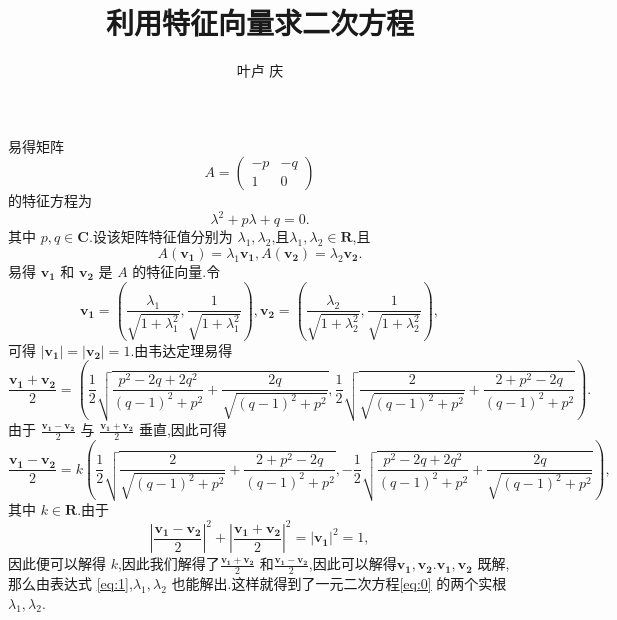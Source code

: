 \documentclass[a4paper]{article}
\begin{document}
\title{\huge{\bf{利用特征向量求二次方程}}} \author{\small{叶卢
    庆}}
\maketitle
易得矩阵
$$
A=\begin{pmatrix}
  -p&-q\\
1&0
\end{pmatrix}
$$
的特征方程为
\begin{equation}\label{eq:0}
\lambda^2+p\lambda+q=0.
\end{equation}
其中 $p,q\in \mathbf{C}$.设该矩阵特征值分别为 $\lambda_1,\lambda_2$,且$\lambda_1,\lambda_2\in \mathbf{R}$,且
$$
A(\mathbf{v_1})=\lambda_1\mathbf{v_1},A(\mathbf{v_2})=\lambda_2\mathbf{v_2}.
$$
易得 $\mathbf{v_1}$ 和 $\mathbf{v_2}$ 是 $A$ 的特征向量.令
\begin{equation}\label{eq:1}
\mathbf{v_1}=(\frac{\lambda_1}{\sqrt{1+\lambda_1^2}},\frac{1}{\sqrt{1+\lambda_1^2}}),\mathbf{v_2}=(\frac{\lambda_2}{\sqrt{1+\lambda_2^2}},\frac{1}{\sqrt{1+\lambda_2^2}}),
\end{equation}
可得 $|\mathbf{v_1}|=|\mathbf{v_2}|=1$.由韦达定理易得
$$
\frac{\mathbf{v_1}+\mathbf{v_2}}{2}=\left(\frac{1}{2}\sqrt{\frac{p^2-2q+2q^2}{(q-1)^2+p^2}+\frac{2q}{\sqrt{(q-1)^2+p^2}}},\frac{1}{2}\sqrt{\frac{2}{\sqrt{(q-1)^2+p^2}}+\frac{2+p^2-2q}{(q-1)^2+p^2}}\right).
$$
由于 $\frac{\mathbf{v_1-v_2}}{2}$ 与 $\frac{\mathbf{v_1+v_2}}{2}$ 垂直,因此可得
$$
\frac{\mathbf{v_1}-\mathbf{v_2}}{2}=k\left(\frac{1}{2}\sqrt{\frac{2}{\sqrt{(q-1)^2+p^2}}+\frac{2+p^2-2q}{(q-1)^2+p^2}},-\frac{1}{2}\sqrt{\frac{p^2-2q+2q^2}{(q-1)^2+p^2}+\frac{2q}{\sqrt{(q-1)^2+p^2}}}\right),
$$
其中 $k\in \mathbf{R}$.由于
$$
\left|\frac{\mathbf{v_1}-\mathbf{v_2}}{2}\right|^2+\left|\frac{\mathbf{v_1}+\mathbf{v_2}}{2}\right|^2=|\mathbf{v_1}|^2=1,
$$
因此便可以解得 $k$,因此我们解得了$\frac{\mathbf{v_1}+\mathbf{v_2}}{2}$ 和$\frac{\mathbf{v_1}-\mathbf{v_2}}{2}$,因此可以解得$\mathbf{v_1},\mathbf{v_2}$.$\mathbf{v_1},\mathbf{v_2}$ 既解,那么由表达式 \eqref{eq:1},$\lambda_1,\lambda_2$ 也能解出.这样就得到了一元二次方程\eqref{eq:0} 的两个实根 $\lambda_1,\lambda_2$.
\end{document}
